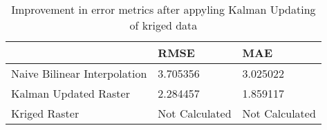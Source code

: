 \begin{table}
\caption{Improvement in error metrics after appyling Kalman Updating of kriged data}
\label{tab:Oahu1_lidar_error}
\begin{tabular}{lll}
\toprule
 & RMSE & MAE \\
\midrule
Naive Bilinear Interpolation & 3.705356 & 3.025022 \\
Kalman Updated Raster & 2.284457 & 1.859117 \\
Kriged Raster & Not Calculated & Not Calculated \\
\bottomrule
\end{tabular}
\end{table}
